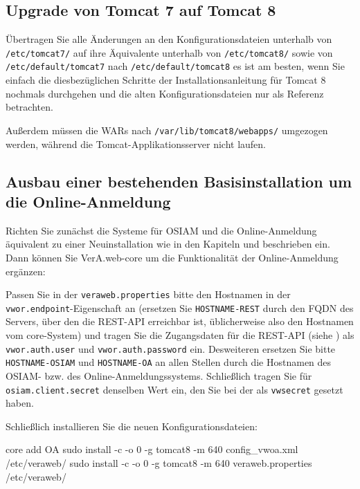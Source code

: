 \iffalse
Wenn Anpassungen gemacht wurden, müssen diese entsprechend angepasst
werden, wie es in \nameref{sec:l10n} beschrieben ist.
\fi

\subsection{Upgrade von Tomcat 7 auf Tomcat 8}

Übertragen Sie alle Änderungen an den Konfigurationsdateien
unterhalb von \texttt{/etc/tomcat7/} auf ihre Äquivalente
unterhalb von \texttt{/etc/tomcat8/} sowie von
\texttt{/etc/default/tomcat7} nach \texttt{/etc/default/tomcat8}
\dash es ist am besten, wenn Sie einfach die diesbezüglichen
Schritte der Installationsanleitung für Tomcat 8 nochmals
durchgehen und die alten Konfigurationsdateien nur als Referenz
betrachten.

Außerdem müssen die WARs nach \texttt{/var/lib/tomcat8/webapps/}
umgezogen werden, während die Tomcat-Applikationsserver nicht laufen.

\ifoa%

\subsection{Ausbau einer bestehenden Basisinstallation um die Online-Anmeldung}

Richten Sie zunächst die Systeme für OSIAM und die Online-Anmeldung
äquivalent zu einer Neuinstallation \dash wie in den Kapiteln
 und  beschrieben
\dash ein. Dann können Sie VerA.web-core um die Funktionalität der
Online-Anmeldung ergänzen:

Passen Sie in der \texttt{veraweb.properties} bitte den Hostnamen
in der \texttt{vwor.endpoint}-Eigenschaft an (ersetzen Sie
\texttt{HOSTNAME-REST} durch den FQDN des Servers, über den die
REST-API erreichbar ist, üblicherweise also den Hostnamen vom
core-System) und tragen Sie die Zugangsdaten für die REST-API
(siehe ) als \texttt{vwor.auth.user}
und \texttt{vwor.auth.password} ein.
Desweiteren ersetzen Sie bitte \texttt{HOSTNAME-OSIAM} und
\texttt{HOSTNAME-OA} an allen Stellen durch die Hostnamen
des OSIAM- bzw. des Online-Anmeldungssystems. Schließlich
tragen Sie für \texttt{osiam.client.secret} denselben Wert
ein, den Sie bei der 
als \texttt{vwsecret} gesetzt haben.

\begin{minipage}{\linewidth}
Schließlich installieren Sie die neuen Konfigurationsdateien:

\begin{lstdump}{core add OA}
sudo install -c -o 0 -g tomcat8 -m 640 config_vwoa.xml /etc/veraweb/
sudo install -c -o 0 -g tomcat8 -m 640 veraweb.properties /etc/veraweb/
\end{lstdump}
\end{minipage}

